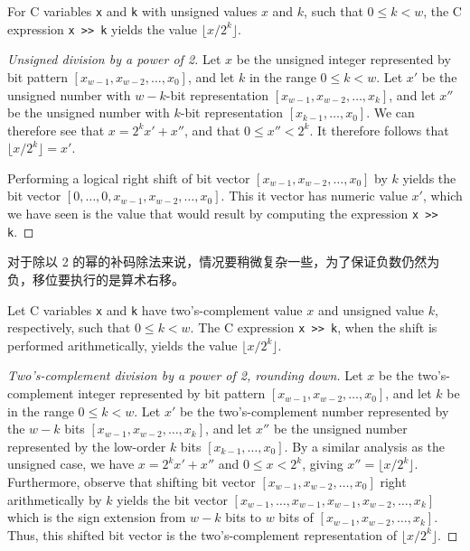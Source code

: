 \begin{theorem}
    For C variables \verb|x| and \verb|k| with unsigned values $x$ and $k$, such that $0 \leq k < w$, the C expression \verb|x >> k| yields the value $\lfloor x / 2^k \rfloor$.
\end{theorem}

\begin{proof}[Unsigned division by a power of 2]
    Let $x$ be the unsigned integer represented by bit pattern $[x_{w-1}, x_{w-2}, \dots, x_0]$, and let $k$ in the range $0 \leq k < w$. Let $x'$ be the unsigned number with $w-k$-bit representation $[x_{w-1}, x_{w-2}, \dots, x_k]$, and let $x''$ be the unsigned number with $k$-bit representation $[x_{k-1}, \dots, x_0]$. We can therefore see that $x = 2^k x' + x''$, and that $0 \leq x'' < 2^k$. It therefore follows that $\lfloor x / 2^k \rfloor = x'$.

    Performing a logical right shift of bit vector $[x_{w-1}, x_{w-2}, \dots, x_0]$ by $k$ yields the bit vector $[0, \dots, 0, x_{w-1}, x_{w-2}, \dots, x_0]$. This it vector has numeric value $x'$, which we have seen is the value that would result by computing the expression \verb|x >> k|.
\end{proof}

对于除以 2 的幂的补码除法来说，情况要稍微复杂一些，为了保证负数仍然为负，移位要执行的是算术右移。

\begin{theorem}
    Let C variables \verb|x| and \verb|k| have two’s-complement value $x$ and unsigned value $k$, respectively, such that $0 \leq k < w$. The C expression \verb|x >> k|, when the shift is performed arithmetically, yields the value $\lfloor x / 2^k \rfloor$.
\end{theorem}

\begin{proof}[Two's-complement division by a power of 2, rounding down]
    Let $x$ be the two’s-complement integer represented by bit pattern $[x_{w−1}, x_{w−2}, \dots, x_0]$, and let $k$ be in the range $0 \leq k < w$. Let $x'$ be the two’s-complement number represented by the $w−k$ bits $[x_{w−1}, x_{w−2}, \dots, x_k]$, and let $x''$ be the unsigned number represented by the low-order $k$ bits $[x_{k−1}, \dots, x_0]$. By a similar analysis as the unsigned case, we have $x = 2^kx' + x''$ and $0 \leq x  < 2^k$, giving $x'' = \lfloor x / 2^k \rfloor$. Furthermore, observe that shifting bit vector $[x_{w−1}, x_{w−2}, \dots, x_0]$ right arithmetically by $k$ yields the bit vector $[x_{w−1}, \dots, x_{w−1}, x_{w−1}, x_{w−2}, \dots, x_k]$ which is the sign extension from $w − k$ bits to $w$ bits of $[x_{w−1}, x_{w−2}, \dots, x_k]$. Thus, this shifted bit vector is the two’s-complement representation of $\lfloor x / 2^k \rfloor$.
\end{proof}

